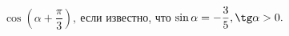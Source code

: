 \begin{ex}[type=equation]
	\begin{condition}
		$\cos {\left(\alpha + \dfrac{\pi}{3}\right)} ,\  $если известно, что $\sin \alpha = -\dfrac{3}{5},\tg \alpha > 0.$
	\end{condition}
\end{ex}